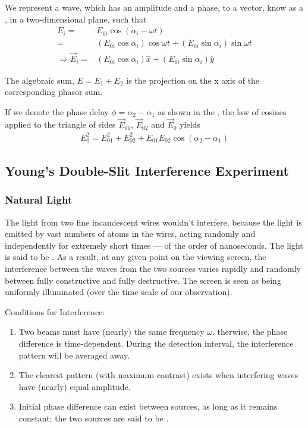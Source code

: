We represent a wave, which has an amplitude and a phase, to a vector, know as a , in a two-dimensional plane, such that
\begin{align*}
    E_i=&E_{0i}\cos(\alpha_i-\omega t)\\
    =&\left(E_{0i}\cos\alpha_i\right)\cos\omega t+\left(E_{0i}\sin\alpha_i\right)\sin\omega t\\
    \Longrightarrow\vec{E}_i=&\left(E_{0i}\cos\alpha_i\right)\hat{x}+\left(E_{0i}\sin\alpha_i\right)\hat{y}
\end{align*}

The algebraic sum, $E=E_1+E_2$ is the projection on the x axis of the corresponding phasor sum. 

If we denote the phase delay $\phi=\alpha_2-\alpha_1$ as shown in the , the law of cosines applied to the triangle of sides $\vec{E}_{01}$, $\vec{E}_{02}$ and $\vec{E}_{0}$ yields 
\begin{align*}
    E_0^2=E_{01}^2+E_{02}^2+E_{01}E_{02}\cos(\alpha_2-\alpha_1)
\end{align*}


\subsection{Young's Double-Slit Interference Experiment}

\subsubsection{Natural Light}
The light from two fine incandescent wires wouldn't interfere, because the light is emitted by vast numbers of atoms in the wires, acting randomly and independently for extremely short times --- of the order of nanoseconds. The light is said to be . As a result, at any given point on the viewing screen, the interference between the waves from the two sources varies rapidly and randomly between fully constructive and fully destructive. The screen is seen as being uniformly illuminated (over the time scale of our observation). 

Conditions for Interference: 
\begin{enumerate}
    \item Two beams must have (nearly) the same frequency $\omega$. therwise, the phase difference is time-dependent. During the detection interval, the interference pattern will be averaged away.
    \item The clearest pattern (with maximum contrast) exists when interfering waves have (nearly) equal amplitude. 
    \item Initial phase difference can exist between sources, as long as it remains constant; the two sources are said to be .
\end{enumerate}

